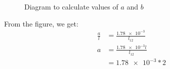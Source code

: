 \documentclass[11pt]{article}
\begin{document}
\begin{flushleft}
\begin{itemize}
\begin{figure}[ht]
                    \caption{Diagram to calculate values of $a$ and $b$}
                \end{figure}
                From the figure, we get:
                \begin{align*}
                    \frac{a}{l} &= \frac{\num{1.78e-3}}{l_{12}}\\
                    a &= \frac{\num{1.78e-3}l}{l_{12}}\\
                    &= \num{1.78e-3}*2
                \end{align*}

                
            \end{itemize}
            
        
        
    \end{flushleft}
\end{document}

